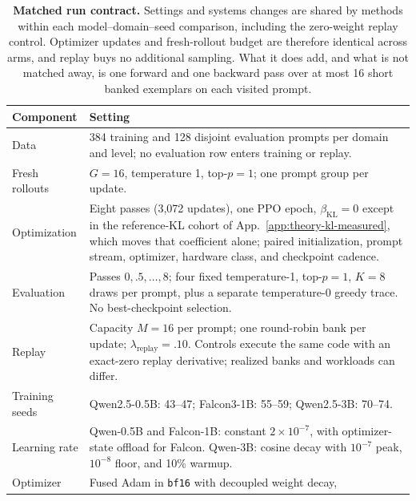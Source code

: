 \documentclass{article}
\newcommand{\1}{\mathbf 1}
\theoremstyle{remark}
\theoremstyle{definition}
\theoremstyle{plain}
\begin{document}
\begin{table}[!htbp]
  \centering
  \caption{\textbf{Matched run contract.} Settings and systems changes are
  shared by methods within each model--domain--seed comparison, including
  the zero-weight replay control. Optimizer updates and fresh-rollout budget
  are therefore identical across arms, and replay buys no additional sampling.
  What it does add, and what is not matched away, is one forward and one
  backward pass over at most 16 short banked exemplars on each visited prompt.}
  \label{tab:run-contract}
  \small
  \begin{tabularx}{\linewidth}{@{}P{.23\linewidth}Y@{}}
    \toprule
    \textbf{Component} & \textbf{Setting} \\
    \midrule
    Data & 384 training and 128 disjoint evaluation prompts per domain and
      level; no evaluation row enters training or replay. \\
    Fresh rollouts & $G=16$, temperature 1, top-$p=1$; one prompt group per update. \\
    Optimization & Eight passes (3,072 updates), one PPO epoch,
      $\beta_{\mathrm{KL}}=0$ except in the reference-KL cohort of
      App.~\ref{app:theory-kl-measured}, which moves that coefficient alone;
      paired initialization, prompt stream, optimizer, hardware class, and
      checkpoint cadence. \\
    Evaluation & Passes $0,.5,\ldots,8$; four fixed temperature-1,
      top-$p=1$, $K=8$ draws per prompt, plus a separate temperature-0
      greedy trace. No best-checkpoint selection. \\
    Replay & Capacity $M=16$ per prompt; one round-robin bank per update;
      $\lambda_{\mathrm{replay}}=.10$. Controls execute the same code with
      an exact-zero replay derivative; realized banks and workloads can differ. \\
    Training seeds & Qwen2.5-0.5B: 43--47; Falcon3-1B: 55--59;
      Qwen2.5-3B: 70--74. \\
    Learning rate & Qwen-0.5B and Falcon-1B: constant $2\times10^{-7}$,
      with optimizer-state offload for Falcon. Qwen-3B: cosine decay with
      $10^{-7}$ peak, $10^{-8}$ floor, and 10\% warmup. \\
    Optimizer & Fused Adam in \texttt{bf16} with decoupled weight decay,

\end{tabularx}
\end{table}
\end{document}
